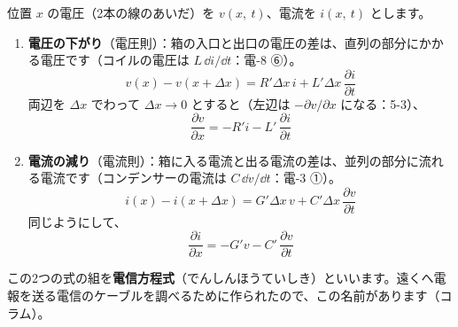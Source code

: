 位置 $x$ の電圧（2本の線のあいだ）を $v(x,\ t)$、電流を $i(x,\ t)$ とします。
\begin{enumerate}[label={\bkcircled{\arabic*}}, leftmargin=2.4\zw, itemsep=2pt, topsep=2pt]
\item \textbf{電圧の下がり}（電圧則）：箱の入口と出口の電圧の差は、直列の部分にかかる電圧です（コイルの電圧は $L\,\dd i/\dd t$：電-8 ⑥）。
\[v(x)-v(x+\Delta x)=R'\Delta x\,i+L'\Delta x\,\frac{\partial i}{\partial t}\]
両辺を $\Delta x$ でわって $\Delta x\to0$ とすると（左辺は $-\partial v/\partial x$ になる：5-3）、
\[\frac{\partial v}{\partial x}=-R'i-L'\,\frac{\partial i}{\partial t}\]
\item \textbf{電流の減り}（電流則）：箱に入る電流と出る電流の差は、並列の部分に流れる電流です（コンデンサーの電流は $C\,\dd v/\dd t$：電-3 ①）。
\[i(x)-i(x+\Delta x)=G'\Delta x\,v+C'\Delta x\,\frac{\partial v}{\partial t}\]
同じようにして、
\[\frac{\partial i}{\partial x}=-G'v-C'\,\frac{\partial v}{\partial t}\]
\end{enumerate}
この2つの式の組を\textbf{電信方程式}（でんしんほうていしき）といいます。遠くへ電報を送る電信のケーブルを調べるために作られたので、この名前があります（コラム）。\label{ph:電-13:denshin}


